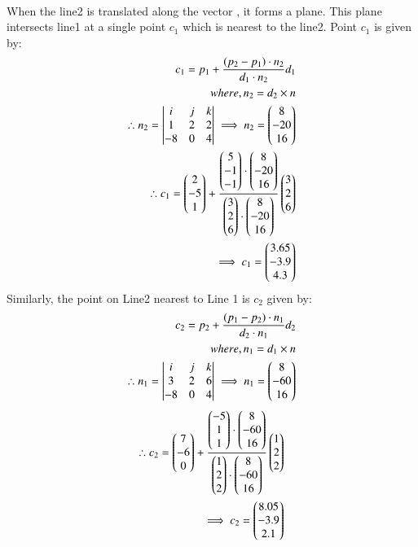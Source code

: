 \documentclass[journal,12pt,twocolumn]{IEEEtran}
\begin{document}
\\
When the line2 is translated along the vector , it forms a plane. This plane intersects line1 at a single point $c_1$ which is nearest to the line2. Point $c_1$ is given by:
\\
\begin{align}
c_1=p_1+\frac{(p_2-p_1)\cdot n_2}{d_1\cdot n_2}d_1 \\
where, n_2=d_2\times n\\
 \therefore n_2=\begin{vmatrix}i & j & k\\1 &2 &2\\-8&0&4\end{vmatrix}
\implies n_2=\begin{pmatrix}8 \\ -20 \\ 16\end{pmatrix}\\
\therefore c_1= \begin{pmatrix}2\\-5\\1\end{pmatrix}+\frac{\begin{pmatrix}5\\-1\\-1\end{pmatrix}\cdot \begin{pmatrix}8\\-20\\16\end{pmatrix}}{\begin{pmatrix}3\\2\\6\end{pmatrix}\cdot \begin{pmatrix}8\\-20\\16\end{pmatrix}}\begin{pmatrix}3\\2\\6\end{pmatrix}\\
\implies c_1=\begin{pmatrix}3.65\\-3.9\\4.3\end{pmatrix}
\end{align}
Similarly, the point on Line2 nearest to Line 1 is $c_2$ given by:\\
\begin{align}
c_2=p_2+\frac{(p_1-p_2)\cdot n_1}{d_2\cdot n_1}d_2 \\
where, n_1=d_1\times n\\
 \therefore n_1=\begin{vmatrix}i & j & k\\3 &2 &6\\-8&0&4\end{vmatrix}
\implies n_1=\begin{pmatrix}8 \\ -60 \\ 16\end{pmatrix}
\end{align}
\begin{align}
\therefore c_2= \begin{pmatrix}7\\-6\\0\end{pmatrix}+\frac{\begin{pmatrix}-5\\1\\1\end{pmatrix}\cdot \begin{pmatrix}8\\-60\\16\end{pmatrix}}{\begin{pmatrix}1\\2\\2\end{pmatrix}\cdot \begin{pmatrix}8\\-60\\16\end{pmatrix}}\begin{pmatrix}1\\2\\2\end{pmatrix}\\
\implies c_2=\begin{pmatrix}8.05\\-3.9\\2.1\end{pmatrix}
\end{align}
\end{document}
